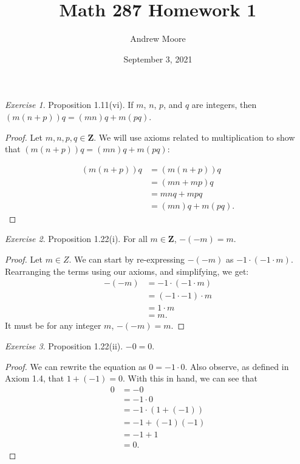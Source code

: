 \documentclass[12pt,oneside]{amsart}
\title{Math 287 Homework 1}
\author{Andrew Moore}
\date{September 3, 2021} %
\theoremstyle{remark}
\newtheorem{exer}{Exercise}
\begin{document}
\maketitle

\newpage
\begin{exer}
Proposition 1.11(vi). If $m$, $n$, $p$, and $q$ are integers, then \newline
$(m(n+p))q = (mn)q + m(pq)$.
\end{exer}

\begin{proof}
Let $m, n, p, q \in \mathbf{Z}.$ We will use axioms related to multiplication to show that $(m(n + p))q = (mn)q + m(pq):$

\begin{align*}
(m(n + p))q &= (m(n + p))q \\
            &= (mn + mp)q \tag{Axiom 1.1.3} \\
            &= mnq + mpq \tag{Axiom 1.1.3} \\
            &= (mn)q + m(pq). \tag{Axiom 1.1.5}
\end{align*}
\end{proof}

\newpage
\begin{exer}
Proposition 1.22(i). For all $m \in \mathbf{Z}$, $-(-m) = m$.
\end{exer}

\begin{proof}
Let $m \in Z$. We can start by re-expressing $-(-m)$ as $-1 \cdot (-1 \cdot m)$. Rearranging the terms using our axioms, and simplifying, we get:
\begin{align*}
-(-m) &= -1 \cdot (-1 \cdot m) \\
      &= (-1 \cdot -1) \cdot m \tag{Axiom 1.1.4} \\
      &= 1 \cdot m \tag{Corollary 1.21} \\
      &= m. \tag{Axiom 1.3}
\end{align*}
It must be for any integer $m$, $-(-m) = m$.
\end{proof}

\newpage
\begin{exer}
Proposition 1.22(ii). $-0 = 0$.
\end{exer}

\begin{proof}
We can rewrite the equation as $0 = -1 \cdot 0$. Also observe, as defined in Axiom 1.4, that $1 + (-1) = 0$. With this in hand, we can see that
\begin{align*}
0 &= -0 \\
  &= -1 \cdot 0 \\
  &= -1 \cdot (1 + (-1)) \tag{Replacement} \\
  &= -1 + (-1)(-1) \tag{Axiom 1.1.3} \\
  &= -1 + 1 \tag{Simplifying, using Corollary 1.21} \\
  &= 0.
\end{align*}
\end{proof}
\end{document}
